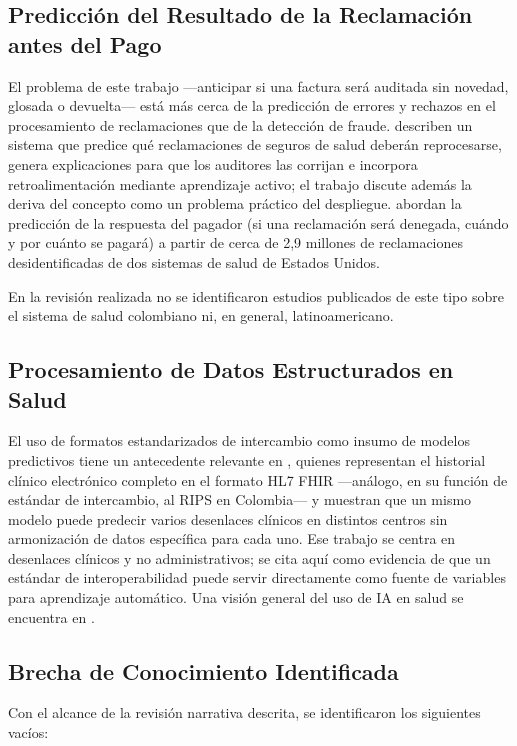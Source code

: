 \documentclass[12pt,letterpaper]{report}
\begin{document}
\subsection{Predicción del Resultado de la Reclamación antes del Pago}

El problema de este trabajo —anticipar si una factura será auditada sin novedad, glosada o devuelta— está más cerca de la predicción de errores y rechazos en el procesamiento de reclamaciones que de la detección de fraude. \cite{kumar2010claims} describen un sistema que predice qué reclamaciones de seguros de salud deberán reprocesarse, genera explicaciones para que los auditores las corrijan e incorpora retroalimentación mediante aprendizaje activo; el trabajo discute además la deriva del concepto como un problema práctico del despliegue. \cite{kim2020deepclaim} abordan la predicción de la respuesta del pagador (si una reclamación será denegada, cuándo y por cuánto se pagará) a partir de cerca de 2,9 millones de reclamaciones desidentificadas de dos sistemas de salud de Estados Unidos.

En la revisión realizada no se identificaron estudios publicados de este tipo sobre el sistema de salud colombiano ni, en general, latinoamericano.

\subsection{Procesamiento de Datos Estructurados en Salud}

El uso de formatos estandarizados de intercambio como insumo de modelos predictivos tiene un antecedente relevante en \cite{rajkomar2018ehr}, quienes representan el historial clínico electrónico completo en el formato HL7 FHIR —análogo, en su función de estándar de intercambio, al RIPS en Colombia— y muestran que un mismo modelo puede predecir varios desenlaces clínicos en distintos centros sin armonización de datos específica para cada uno. Ese trabajo se centra en desenlaces clínicos y no administrativos; se cita aquí como evidencia de que un estándar de interoperabilidad puede servir directamente como fuente de variables para aprendizaje automático. Una visión general del uso de IA en salud se encuentra en \cite{rajpurkar2022ai}.

\subsection{Brecha de Conocimiento Identificada}

Con el alcance de la revisión narrativa descrita, se identificaron los siguientes vacíos:
\end{document}

